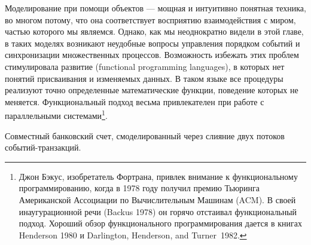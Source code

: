 Моделирование при помощи объектов --- мощная и интуитивно
понятная техника, во многом потому, что она соответствует восприятию
взаимодействия с миром, частью которого мы являемся.  Однако, как мы
неоднократно видели в этой главе, в таких моделях возникают неудобные
вопросы управления порядком событий и синхронизации множественных
процессов.  Возможность избежать этих проблем стимулировала развитие
 (functional programming languages), в которых нет понятий присваивания и
изменяемых данных.  В таком языке все процедуры реализуют точно
определенные математические функции, поведение которых не меняется.
  Функциональный подход
весьма привлекателен при
работе с параллельными системами\footnote{Джон Бэкус,  изобретатель Фортрана, привлек внимание к
функциональному программированию, когда в 1978 году получил премию
Тьюринга Американской Ассоциации по Вычислительным Машинам (ACM).  В своей
инаугурационной речи
(Backus 1978)
он горячо отстаивал
функциональный подход.  Хороший обзор функционального программирования
дается в книгах Henderson 1980
и Darlington, Henderson, and Turner~1982.}.

\begin{cntrfig}

\caption{Совместный банковский счет, смоделированный через слияние двух потоков
событий-транзакций.}
\label{P3.38}
\end{cntrfig}

